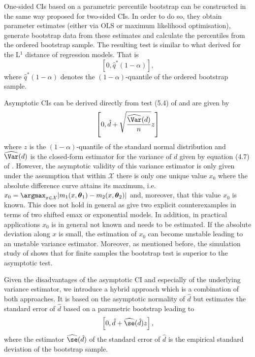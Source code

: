{One-sided CIs based on a parametric percentile bootstrap can be constructed in the same way \citet{Moellenhoff2018} proposed for two-sided CIs. 
In order to do so, they obtain parameter estimates (either via OLS or maximum likelihood optimisation), generate bootstrap data from these estimates and calculate  the percentiles from the ordered bootstrap sample.
The resulting test is similar to what \citet[][Algorithm 1]{Bastian2024} derived for the L$^1$ distance of regression models. That is
$$
\left[0, \hat{q}^*(1- \alpha)\right],
$$
where $\hat{q}^*(1- \alpha)$ denotes the $(1-\alpha)$-quantile of the ordered bootstrap sample. 

Asymptotic CIs can be derived directly from test (5.4) of \citet{Dette2018} and are given by 
\begin{equation} \label{eq:CIasymp}
\left[0, \hat{d} + \sqrt{\frac{\widehat{\Var}(d)}{n}} z \right]
\end{equation}
where $z$ is the $(1-\alpha)$-quantile of the standard normal distribution and $\widehat{\Var}(d)$ is the closed-form estimator for the variance of $d$ given by equation (4.7) of \citet{Dette2018}. 
However, the asymptotic validity of this variance estimator is only given under the assumption that within $\mathcal{X}$ there is only one unique value $x_0$ 
where the absolute difference curve attains its maximum, i.e.
$x_0 = \argmax_{x \in \mathcal{X}}|m_1(x, \boldsymbol{\theta}_{1}) - m_2(x, \boldsymbol{\theta}_{2})|$ 
 and, moreover, that this value $x_0$ is known. 
This does not hold in general as \citet{Dette2018} give two explicit counterexamples in terms of two shifted emax or exponential models. In addition, in practical applications $x_0$ is in general not known and needs to be estimated. If the absolute deviation along $x$ is small, the estimation of $x_0$ can become unstable leading to an unstable variance estimator. 
Moreover, as mentioned before, the simulation study of \citet{Dette2018} shows that for finite samples the bootstrap test is superior to the asymptotic test. 

Given the disadvantages of the asymptotic CI and especially of the underlying variance estimator, we introduce a hybrid approach which is a combination of both approaches. It is based on the asymptotic normality of $\hat d$ but estimates the standard error of $\hat{d}$ based on a parametric bootstrap 
leading to 
$$
\left[0, \hat{d} + \widehat{\se}(\hat{d}) z \right],
$$
where the estimator $\widehat{\se}(\hat{d})$ of the standard error of $\hat{d}$ is the empirical standard deviation of the bootstrap sample. 

}
